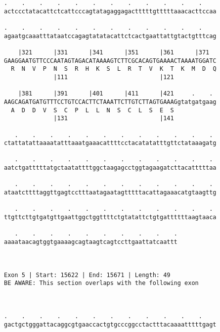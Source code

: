 \documentclass{article}
\begin{document}
\begin{Verbatim}
.    .    .    .    .    .    .    .    .    .    .    .    
actccctatacattctcattcccagtatagaggagactttttgtttttaaacacttccaa
                                                            
.    .    .    .    .    .    .    .    .    .    .    .    
agaatgcaaatttataatccagagtatatacattctcactgaattattgtactgtttcag
                                                            
    |321      |331      |341      |351      |361      |371  
GAAGGAATGTTCCCAATAGTAGACATAAAAGTCTTCGCACAGTGAAAACTAAAATGGATC
  R  N  V  P  N  S  R  H  K  S  L  R  T  V  K  T  K  M  D  Q
              |111                          |121            
  
    |381      |391      |401      |411      |421     .    . 
AAGCAGATGATGTTTCCTGTCCACTTCTAAATTCTTGTCTTAGTGAAAGgtatgatgaag
  A  D  D  V  S  C  P  L  L  N  S  C  L  S  E  S            
              |131                          |141            
  
   .    .    .    .    .    .    .    .    .    .    .    . 
ctattatattaaaatatttaaatgaaacattttcctacatatatttgttctataaagatg
                                                            
   .    .    .    .    .    .    .    .    .    .    .    . 
aatctgatttttatgctaatattttggctaagagcctggtagaagatcttacatttttaa
                                                            
   .    .    .    .    .    .    .    .    .    .    .    . 
ataatcttttaggttgagtcctttaatagaatagtttttacattagaaacatgtaagttg
                                                            
   .    .    .    .    .    .    .    .    .    .    .    . 
ttgttcttgtgatgttgaattggctggttttctgtatattctgtgattttttaagtaaca
                                                            
   .    .    .    .    .    .    .    .    .    .
aaaataacagtggtgaaaagcagtaagtcagtccttgaattatcaattt
                                                 
                                                 
 
Exon 5 | Start: 15622 | End: 15671 | Length: 49
BE AWARE: This section overlaps with the following exon



.    .    .    .    .    .    .    .    .    .    .    .    
gactgctgggattacaggcgtgaaccactgtgcccggcctactttacaaaatttttgagt
                                                            

\end{Verbatim}
\end{document}

